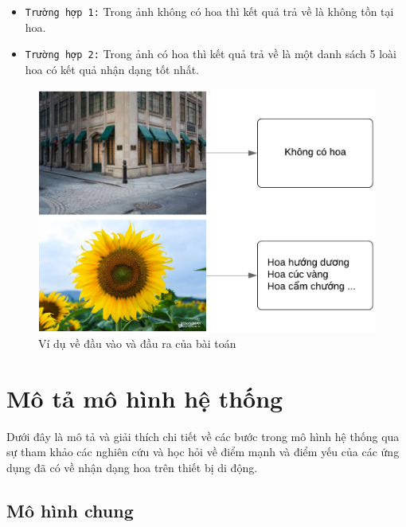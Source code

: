 \documentclass[12pt]{report}
\begin{document}
		\begin{itemize}
			\item \texttt{Trường hợp 1:} Trong ảnh không có hoa thì kết quả trả về là không tồn tại hoa.
			\item \texttt{Trường hợp 2:} Trong ảnh có hoa thì kết quả trả về là một danh sách 5 loài hoa có kết quả nhận dạng tốt nhất.
		\end{itemize}
		\begin{figure}[h]
			\centering
			\includegraphics[scale=0.4]{mota_baitoan}
			\caption{Ví dụ về đầu vào và đầu ra của bài toán}
			\label{fig:mota_baitoan}
		\end{figure}\newpage
														
		\section{Mô tả mô hình hệ thống}
		Dưới đây là mô tả và giải thích chi tiết về các bước trong mô hình hệ thống qua sự tham khảo các nghiên cứu \cite{cia-Nilsback06} \cite{cia-Nilsback08} \cite{cia-ONE} \cite{cia-CNNFeatures off-the-shelf} \cite{cia_vgg19} và học hỏi về điểm mạnh và điểm yếu của các ứng dụng đã có về nhận dạng hoa trên thiết bị di động.
														
		\subsection{Mô hình chung}
\end{document}
